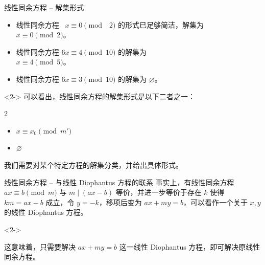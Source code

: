 \documentclass{../pkslide}
\begin{document}
\begin{frame}{线性同余方程 -- 解集形式}
  \begin{examples}[线性同余方程的解集]
    \begin{itemize}
      \item 线性同余方程 $\phantom{1}x \equiv 0 \pmod{\phantom{0}2}$ 的形式已足够简洁，解集为\\
        \-\hspace{2em}$x \equiv 0 \pmod{2}$。
      \item 线性同余方程 $6 x \equiv 4 \pmod{10}$ 的解集为\\
        \-\hspace{2em}$x \equiv 4 \pmod{5}$。
      \item 线性同余方程 $6 x \equiv 3 \pmod{10}$ 的解集为 $\varnothing$。
    \end{itemize}
  \end{examples}
  
  \begin{visibleenv}<2->
    可以看出，线性同余方程的解集形式是以下二者之一：
    
    \begin{mymulticols}[l][l]{2}
      \begin{itemize}
        \item $x \equiv x_0 \pmod{m'}$
        \item $\varnothing$
      \end{itemize}
    \end{mymulticols}

    \emptyline
    
    我们需要对某个特定方程的解集分类，并给出具体形式。
  \end{visibleenv}
\end{frame}

\begin{frame}{线性同余方程 -- 与线性 Diophantus 方程的联系}
  事实上，有线性同余方程 $a x \equiv b \pmod{m}$ 与 $m \mid (a x - b)$ 等价，并进一步等价于存在 $k$ 使得 $k m = a x - b$ 成立，令 $y = -k$，移项后变为 $a x + m y = b$，可以看作一个关于 $x, y$ 的线性 Diophantus 方程。
  
  \begin{visibleenv}<2->
    \emptyline
    
    这意味着，只需要解决 $a x + m y = b$ 这一线性 Diophantus 方程，即可解决原线性同余方程。
  \end{visibleenv}
\end{frame}
\end{document}
